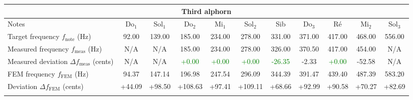\begin{table}[H]
{\begin{tabular}{lcccccccccc}
\multicolumn{11}{c}{\textbf{Third alphorn}} \\
\hline
Notes & Do$_1$ & Sol$_1$ & Do$_2$ & Mi$_1$ & Sol$_2$ & Sib & Do$_3$ & Ré & Mi$_2$ & Sol$_3$ \\
\hline
Target frequency $f_{\mathrm{note}}$ (Hz) & 92.00 & 139.00 & 185.00 & 234.00 & 278.00 & 331.00 & 371.00 & 417.00 & 468.00 & 556.00 \\
Measured frequency $f_{\mathrm{meas}}$ (Hz) & N/A & N/A & 185.00 & 234.00 & 278.00 & 326.00 & 370.50 & 417.00 & 454.00 & N/A \\
Measured deviation $\Delta f_{\mathrm{meas}}$ (cents) & N/A & N/A & \textcolor{green}{+0.00} & \textcolor{green}{+0.00} & \textcolor{green}{+0.00} & \textcolor{green}{-26.35} & -2.33 & \textcolor{green}{+0.00} & -52.58 & N/A \\
FEM frequency $f_{\mathrm{FEM}}$ (Hz) & 94.37 & 147.14 & 196.98 & 247.54 & 296.09 & 344.39 & 391.47 & 439.40 & 487.39 & 583.20 \\
Deviation $\Delta f_{\mathrm{FEM}}$ (cents) & +44.09 & +98.50 & +108.63 & +97.41 & +109.11 & +68.66 & +92.99 & +90.58 & +70.27 & +82.69 \\
\hline \\

\end{tabular}
}
\label{tab:real_alphorns}

\end{table}
